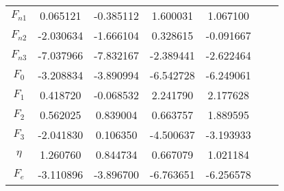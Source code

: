 \documentclass[prb,preprint]{revtex4-2}
\begin{document}
\begin{table}
{\begin{tabular}{ccccccc}
$F_{n1}$     & 0.065121    & -0.385112   & 1.600031    & 1.067100    &            &              \\
$F_{n2}$     & -2.030634   & -1.666104   & 0.328615    & -0.091667   &            &              \\
$F_{n3}$     & -7.037966   & -7.832167   & -2.389441   & -2.622464   &            &              \\
$F_{0}$      & -3.208834   & -3.890994   & -6.542728   & -6.249061   &            &              \\
$F_{1}$      & 0.418720    & -0.068532   & 2.241790    & 2.177628    &            &              \\
$F_{2}$      & 0.562025    & 0.839004    & 0.663757    & 1.889595    &            &              \\
$F_{3}$      & -2.041830   & 0.106350    & -4.500637   & -3.193933   &            &              \\
$\eta$       & 1.260760    & 0.844734    & 0.667079    & 1.021184    &            &              \\
$F_{e}$      & -3.110896   & -3.896700   & -6.763651   & -6.256578   &            &              \\
\bottomrule
\end{tabular}
}
\label{tab:binary_MoNi_eam}
\end{table}

% 
%
\begin{table}
\caption{
Model parameters of the $\mu(r)$ and $\omega(r)$ functions of the binary Mo-Ni 
ML-ADP.
}
\label{tab:binary_MoNi_adp}
\end{table}
\end{document}
